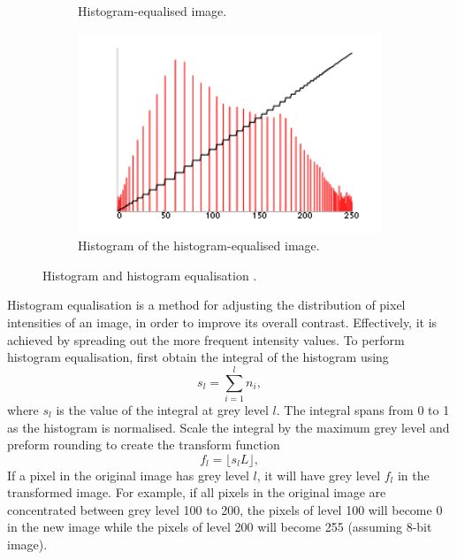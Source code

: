 \documentclass[conference]{IEEEtran}
\begin{document}
\begin{figure}[htbp]
\begin{subfigure}{0.4\textwidth}
        \caption{Histogram-equalised image.}
        \label{C equalised}
    \end{subfigure}
    \begin{subfigure}{0.4\textwidth}
        \centering
        \includegraphics[width=1\textwidth]{Images/C equalised histogram.png}
        \caption{Histogram of the histogram-equalised image.}
        \label{C equalised histogram}
    \end{subfigure}
    \caption{Histogram and histogram equalisation \cite{Histogram equalisation wiki}.}
    \label{Histogram and histogram equalisation}
\end{figure}

Histogram equalisation is a method for adjusting the distribution of pixel intensities of an image, in order to improve its overall contrast. Effectively, it is achieved by spreading out the more frequent intensity values. To perform histogram equalisation, first obtain the integral of the histogram using
\[s_l = \sum_{i=1}^{l} n_i,\]
where $s_l$ is the value of the integral at grey level $l$. The integral spans from 0 to 1 as the histogram is normalised. Scale the integral by the maximum grey level and preform rounding to create the transform function
\begin{equation}
    f_l = \lfloor s_lL \rfloor,
\end{equation}
If a pixel in the original image has grey level $l$, it will have grey level $f_l$ in the transformed image. For example, if all pixels in the original image are concentrated between grey level 100 to 200, the pixels of level 100 will become 0 in the new image while the pixels of level 200 will become 255 (assuming 8-bit image).
\end{document}
